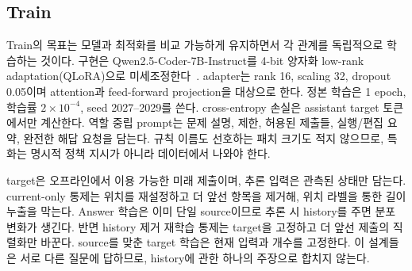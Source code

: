 \documentclass[10pt,conference]{IEEEtran}
\begin{document}
\subsection{Train}
Train의 목표는 모델과 최적화를 비교 가능하게 유지하면서 각 관계를 독립적으로 학습하는 것이다. 구현은 Qwen2.5-Coder-7B-Instruct를 4-bit 양자화 low-rank adaptation(QLoRA)으로 미세조정한다~\cite{hui2024qwen2,dettmers2023qlora}. adapter는 rank 16, scaling 32, dropout 0.05이며 attention과 feed-forward projection을 대상으로 한다. 정본 학습은 1 epoch, 학습률 \(2\times10^{-4}\), seed 2027--2029를 쓴다. cross-entropy 손실은 assistant target 토큰에서만 계산한다. 역할 중립 prompt는 문제 설명, 제한, 허용된 제출들, 실행/편집 요약, 완전한 해답 요청을 담는다. 규칙 이름도 선호하는 패치 크기도 적지 않으므로, 특화는 명시적 정책 지시가 아니라 데이터에서 나와야 한다.

target은 오프라인에서 이용 가능한 미래 제출이며, 추론 입력은 관측된 상태만 담는다. current-only 통제는 위치를 재설정하고 더 앞선 항목을 제거해, 위치 라벨을 통한 길이 누출을 막는다. Answer 학습은 이미 단일 source이므로 추론 시 history를 주면 분포 변화가 생긴다. 반면 history 제거 재학습 통제는 target을 고정하고 더 앞선 제출의 직렬화만 바꾼다. source를 맞춘 target 학습은 현재 입력과 개수를 고정한다. 이 설계들은 서로 다른 질문에 답하므로, history에 관한 하나의 주장으로 합치지 않는다.
\end{document}
